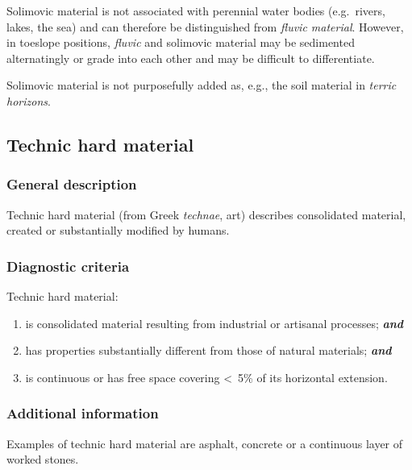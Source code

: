 \documentclass[
  letterpaper,
  DIV=11,
  numbers=noendperiod]{scrreprt}
\providecommand{\tightlist}{%
  \setlength{\itemsep}{0pt}\setlength{\parskip}{0pt}}\usepackage{longtable,booktabs,array}
\begin{document}
Solimovic material is not associated with perennial water bodies
(e.g.~rivers, lakes, the sea) and can therefore be distinguished from
\emph{fluvic material}. However, in toeslope positions, \emph{fluvic}
and solimovic material may be sedimented alternatingly or grade into
each other and may be difficult to differentiate.

Solimovic material is not purposefully added as, e.g., the soil material
in \emph{terric horizons}.

\hypertarget{technic-hard-material}{%
\subsection{Technic hard material}\label{technic-hard-material}}

\hypertarget{general-description-68}{%
\subsubsection{General description}\label{general-description-68}}

Technic hard material (from Greek \emph{technae}, art) describes
consolidated material, created or substantially modified by humans.

\hypertarget{diagnostic-criteria-74}{%
\subsubsection{Diagnostic criteria}\label{diagnostic-criteria-74}}

Technic hard material:

\begin{enumerate}
\def\labelenumi{\arabic{enumi}.}
\tightlist
\item
  is consolidated material resulting from industrial or artisanal
  processes; \textbf{\emph{and}}
\item
  has properties substantially different from those of natural
  materials; \textbf{\emph{and}}
\item
  is continuous or has free space covering \textless~5\% of its
  horizontal extension.
\end{enumerate}

\hypertarget{additional-information-35}{%
\subsubsection{Additional information}\label{additional-information-35}}

Examples of technic hard material are asphalt, concrete or a continuous
layer of worked stones.
\end{document}
